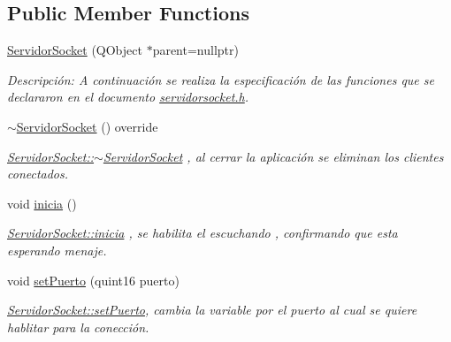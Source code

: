 \subsection*{Public Member Functions}
\begin{DoxyCompactItemize}
\item 
\hyperlink{class_servidor_socket_a2c985a3cb60dbf2fa923060a99d1e06d}{Servidor\+Socket} (Q\+Object $\ast$parent=nullptr)
\begin{DoxyCompactList}\small\item\em Descripción\+: A continuación se realiza la especificación de las funciones que se declararon en el documento \hyperlink{servidorsocket_8h_source}{servidorsocket.\+h}. \end{DoxyCompactList}\item 
\mbox{\label{class_servidor_socket_a9a4b69265d7a58134555cc3d51125470}} 
\hyperlink{class_servidor_socket_a9a4b69265d7a58134555cc3d51125470}{$\sim$\+Servidor\+Socket} () override
\begin{DoxyCompactList}\small\item\em \hyperlink{class_servidor_socket_a9a4b69265d7a58134555cc3d51125470}{Servidor\+Socket\+::$\sim$\+Servidor\+Socket} , al cerrar la aplicación se eliminan los clientes conectados. \end{DoxyCompactList}\item 
\mbox{\label{class_servidor_socket_a23cd19f7c5a14ed1a19ae3ddcc0cd08f}} 
void \hyperlink{class_servidor_socket_a23cd19f7c5a14ed1a19ae3ddcc0cd08f}{inicia} ()
\begin{DoxyCompactList}\small\item\em \hyperlink{class_servidor_socket_a23cd19f7c5a14ed1a19ae3ddcc0cd08f}{Servidor\+Socket\+::inicia} , se habilita el escuchando , confirmando que esta esperando menaje. \end{DoxyCompactList}\item 
void \hyperlink{class_servidor_socket_a331c56c842d1b9a4150ec439fef6431d}{set\+Puerto} (quint16 puerto)
\begin{DoxyCompactList}\small\item\em \hyperlink{class_servidor_socket_a331c56c842d1b9a4150ec439fef6431d}{Servidor\+Socket\+::set\+Puerto}, cambia la variable por el puerto al cual se quiere hablitar para la conección. \end{DoxyCompactList}\item 

\end{DoxyCompactItemize}

